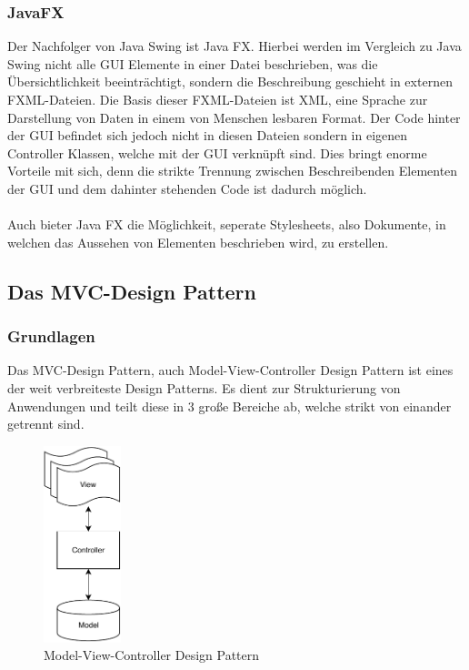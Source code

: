 \subsubsection{JavaFX}
Der Nachfolger von Java Swing ist Java FX. Hierbei werden im Vergleich zu Java Swing nicht alle GUI Elemente in einer Datei beschrieben, was die Übersichtlichkeit beeinträchtigt, sondern die Beschreibung geschieht in externen FXML-Dateien.
Die Basis dieser FXML-Dateien ist XML, eine Sprache zur Darstellung von Daten in einem von Menschen lesbaren Format. Der Code hinter der GUI befindet sich jedoch nicht in diesen Dateien sondern in eigenen Controller Klassen, welche mit der GUI verknüpft sind. Dies bringt enorme Vorteile mit sich, denn die strikte Trennung zwischen Beschreibenden Elementen der GUI
und dem dahinter stehenden Code ist dadurch möglich.\\\\
Auch bieter Java FX die Möglichkeit, seperate Stylesheets, also Dokumente, in welchen das Aussehen von Elementen beschrieben wird, zu erstellen.

\subsection{Das MVC-Design Pattern}
\subsubsection{Grundlagen}
Das MVC-Design Pattern, auch Model-View-Controller Design Pattern ist eines der weit verbreiteste Design Patterns. Es dient zur Strukturierung von Anwendungen und teilt diese in 3 große Bereiche ab, welche strikt von einander getrennt sind.

\begin{figure}[H]
    \centering
    \includegraphics[width=0.2\textwidth]{fig/ainf/ModelViewController.pdf}
    \caption{Model-View-Controller Design Pattern}
\end{figure}

